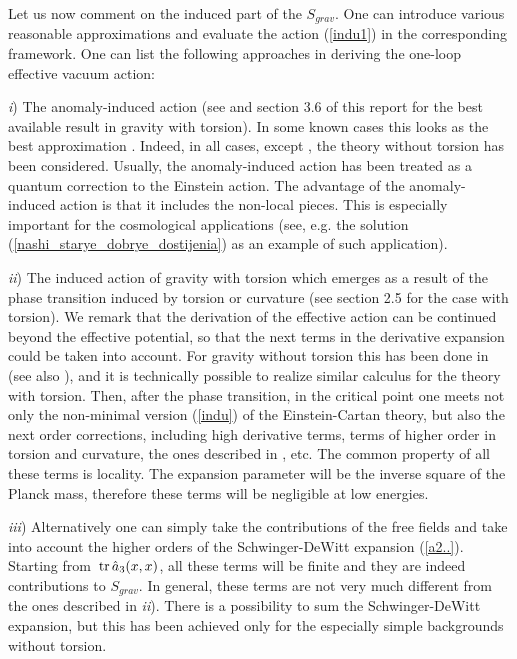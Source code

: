 Let us now comment on the induced part of the $S_{grav}$. 
One can introduce
various reasonable approximations and evaluate the action
(\ref{indu1}) in the corresponding framework. One can list 
the following approaches in deriving the one-loop 
effective vacuum action: 

 {\it i}) The anomaly-induced action (see \cite{anhesh} and section 
3.6 of this report 
for the best available result in gravity with torsion). 
In some known cases this looks as the best approximation
\cite{star,buodsh,anju,balbi}. Indeed, in all 
cases, except \cite{buodsh,anhesh}, the theory without 
torsion has been considered. Usually, the anomaly-induced action 
has been treated as a quantum correction to the Einstein action. 
The advantage of the anomaly-induced action is that it includes 
the non-local pieces. This is especially important for the 
cosmological applications (see, e.g. the solution 
(\ref{nashi_starye_dobrye_dostijenia}) as an example of 
such application).

 {\it ii}) The induced action of gravity with torsion which 
emerges as a result of the phase transition induced by torsion 
or curvature (see section 2.5 for the case with torsion). 
We remark that the derivation of the effective action can be 
continued beyond the effective potential, so that the 
next terms in the derivative expansion could be taken into
account. For gravity without torsion this has been 
done in \cite{wolf} (see also \cite{book}), and it is 
technically possible to realize similar calculus for the 
theory with torsion. Then, after the phase transition, 
in the critical point one meets not only the non-minimal 
version (\ref{indu}) of the Einstein-Cartan theory, but also 
the next order corrections, including high derivative 
terms, terms of higher order in torsion and curvature,
the ones described in \cite{chris}, etc.  
The common property of all these terms is locality. 
The expansion parameter will be the inverse square 
of the Planck mass, therefore
these terms will be negligible at low energies. 

 {\it iii}) Alternatively one can simply take the contributions
of the free fields and take into account the higher orders of 
the Schwinger-DeWitt expansion (\ref{a2..}). Starting from 
$\,{\rm tr}\,{\hat a}_3(x,x)$, all these terms will be
finite and they are indeed contributions to $S_{grav}$.
In general, these terms are not very much different from
the ones described in {\it ii}). There is a possibility 
to sum the Schwinger-DeWitt expansion, but this has been  
achieved \cite{avram} only for the especially simple backgrounds 
without torsion. 

